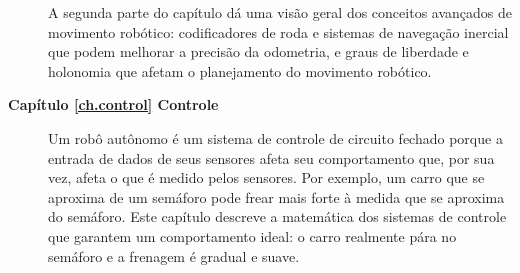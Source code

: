 \begin{description}
A segunda parte do capítulo dá uma visão geral dos conceitos avançados de movimento robótico: codificadores de roda e sistemas de navegação inercial que podem melhorar a precisão da odometria, e graus de liberdade e holonomia que afetam o planejamento do movimento robótico.
\smallskip
\item [\textbf{Capítulo \ref{ch.control} Controle}] Um robô autônomo é um sistema de controle de circuito fechado porque a entrada de dados de seus sensores afeta seu comportamento que, por sua vez, afeta o que é medido pelos sensores. Por exemplo, um carro que se aproxima de um semáforo pode frear mais forte à medida que se aproxima do semáforo. Este capítulo descreve a matemática dos sistemas de controle que garantem um comportamento ideal: o carro realmente pára no semáforo e a frenagem é gradual e suave.
\end{description}

